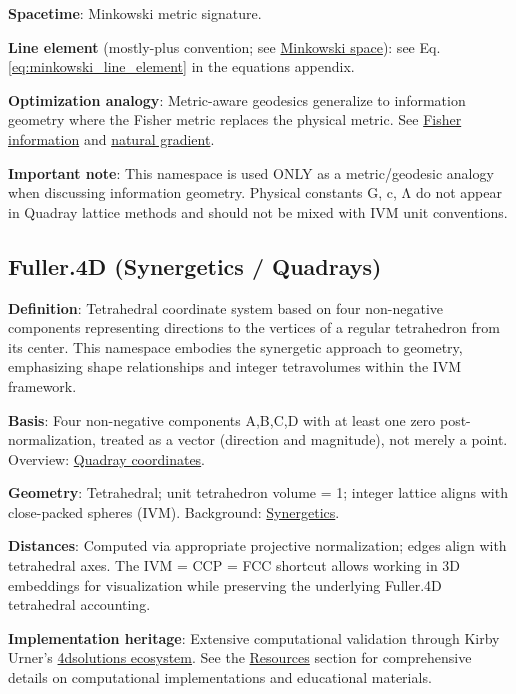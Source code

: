 \documentclass[
  10pt,
]{article}
\begin{document}
\textbf{Spacetime}: Minkowski metric signature.

\textbf{Line element} (mostly-plus convention; see
\href{https://en.wikipedia.org/wiki/Minkowski_space}{Minkowski space}):
see Eq. \eqref{eq:minkowski_line_element} in the equations appendix.

\textbf{Optimization analogy}: Metric-aware geodesics generalize to
information geometry where the Fisher metric replaces the physical
metric. See
\href{https://en.wikipedia.org/wiki/Fisher_information}{Fisher
information} and
\href{https://en.wikipedia.org/wiki/Natural_gradient}{natural gradient}.

\textbf{Important note}: This namespace is used ONLY as a
metric/geodesic analogy when discussing information geometry. Physical
constants G, c, Λ do not appear in Quadray lattice methods and should
not be mixed with IVM unit conventions.

\hypertarget{fuller.4d-synergetics-quadrays}{%
\subsection{Fuller.4D (Synergetics /
Quadrays)}\label{fuller.4d-synergetics-quadrays}}

\textbf{Definition}: Tetrahedral coordinate system based on four
non-negative components representing directions to the vertices of a
regular tetrahedron from its center. This namespace embodies the
synergetic approach to geometry, emphasizing shape relationships and
integer tetravolumes within the IVM framework.

\textbf{Basis}: Four non-negative components A,B,C,D with at least one
zero post-normalization, treated as a vector (direction and magnitude),
not merely a point. Overview:
\href{https://en.wikipedia.org/wiki/Quadray_coordinates}{Quadray
coordinates}.

\textbf{Geometry}: Tetrahedral; unit tetrahedron volume = 1; integer
lattice aligns with close-packed spheres (IVM). Background:
\href{https://en.wikipedia.org/wiki/Synergetics_(Fuller)}{Synergetics}.

\textbf{Distances}: Computed via appropriate projective normalization;
edges align with tetrahedral axes. The IVM = CCP = FCC shortcut allows
working in 3D embeddings for visualization while preserving the
underlying Fuller.4D tetrahedral accounting.

\textbf{Implementation heritage}: Extensive computational validation
through Kirby Urner's \href{https://github.com/4dsolutions}{4dsolutions
ecosystem}. See the \href{07_resources.md}{Resources} section for
comprehensive details on computational implementations and educational
materials.
\end{document}
